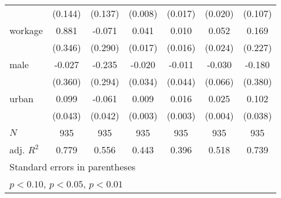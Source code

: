 {\begin{tabular}{l*{6}{c}}
            &     (0.144)         &     (0.137)         &     (0.008)         &     (0.017)         &     (0.020)         &     (0.107)         \\
[1em]
workage     &       0.881\sym{**} &      -0.071         &       0.041\sym{**} &       0.010         &       0.052\sym{**} &       0.169         \\
            &     (0.346)         &     (0.290)         &     (0.017)         &     (0.016)         &     (0.024)         &     (0.227)         \\
[1em]
male        &      -0.027         &      -0.235         &      -0.020         &      -0.011         &      -0.030         &      -0.180         \\
            &     (0.360)         &     (0.294)         &     (0.034)         &     (0.044)         &     (0.066)         &     (0.380)         \\
[1em]
urban       &       0.099\sym{**} &      -0.061         &       0.009\sym{***}&       0.016\sym{***}&       0.025\sym{***}&       0.102\sym{**} \\
            &     (0.043)         &     (0.042)         &     (0.003)         &     (0.003)         &     (0.004)         &     (0.038)         \\
\hline
\(N\)       &         935         &         935         &         935         &         935         &         935         &         935         \\
adj. \(R^{2}\)&       0.779         &       0.556         &       0.443         &       0.396         &       0.518         &       0.739         \\
\hline\hline
\multicolumn{7}{l}{\footnotesize Standard errors in parentheses}\\
\multicolumn{7}{l}{\footnotesize \sym{*} \(p<0.10\), \sym{**} \(p<0.05\), \sym{***} \(p<0.01\)}\\
\end{tabular}
}
